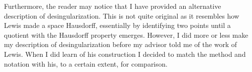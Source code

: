 Furthermore, the reader may notice that I have provided an alternative description of desingularization. This is not quite original as it resembles how Lewis \cite[pp.~158]{Le78} made a space Hausdorff, essentially by identifying two points until a quotient with the Hausdorff property emerges. However, I did more or less make my description of desingularization before my advisor told me of the work of Lewis. When I did learn of his construction I decided to match the method and notation with his, to a certain extent, for comparison.